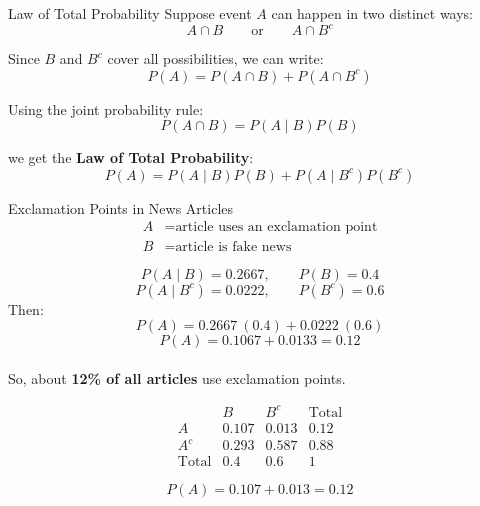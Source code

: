 \documentclass[12pt]{beamer}
\begin{document}
\begin{frame}{}
\begin{block}{Law of Total Probability}
Suppose event \(A\) can happen in two distinct ways:
\[
A \cap B
\qquad \text{or} \qquad
A \cap B^c
\]

Since \(B\) and \(B^c\) cover all possibilities, we can write:
\[
P(A) = P(A \cap B) + P(A \cap B^c)
\]

Using the joint probability rule:
\[
P(A \cap B) = P(A \mid B)P(B)
\]

we get the \textbf{Law of Total Probability}:
\[
P(A)
=
P(A \mid B)P(B)
+
P(A \mid B^c)P(B^c)
\]
\end{block}
\end{frame}

\begin{frame}{}
\begin{block}{Exclamation Points in News Articles}
\[
\begin{aligned}
A &= \text{article uses an exclamation point}\\
B &= \text{article is fake news}
\end{aligned}
\]

\[
P(A \mid B)=0.2667,
\qquad
P(B)=0.4
\]
\[
P(A \mid B^c)=0.0222,
\qquad
P(B^c)=0.6
\]
Then:
\[
P(A)
=
0.2667~(0.4) + 0.0222~(0.6)
\]
\[
P(A)
=
0.1067 + 0.0133
=
0.12
\]\\
So, about \textbf{12\% of all articles} use exclamation points.
\end{block}
\end{frame}

\begin{frame}{}
\begin{block}{}
\[
\begin{array}{c|ccc}
 & B & B^c & \text{Total} \\
\hline
A   & 0.107 & 0.013 & 0.12 \\
A^c & 0.293 & 0.587 & 0.88 \\
\hline
\text{Total} & 0.4 & 0.6 & 1
\end{array}
\]

\[
P(A) = 0.107 + 0.013 = \boxed{0.12}
\]

\end{block}
\end{frame}

\end{document}
